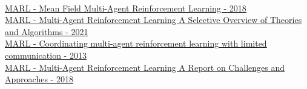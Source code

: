 \\
\href{http://proceedings.mlr.press/v80/yang18d.html}{MARL - Mean Field Multi-Agent Reinforcement Learning - 2018}
\\
\href{https://arxiv.org/abs/1911.10635}{MARL - Multi-Agent Reinforcement Learning A Selective Overview of Theories and Algorithms - 2021}
\\
\href{https://dl.acm.org/doi/abs/10.5555/2484920.2485093}{MARL - Coordinating multi-agent reinforcement learning with limited communication - 2013}
\\
\href{https://arxiv.org/abs/1807.09427}{MARL - Multi-Agent Reinforcement Learning A Report on Challenges and Approaches - 2018}






